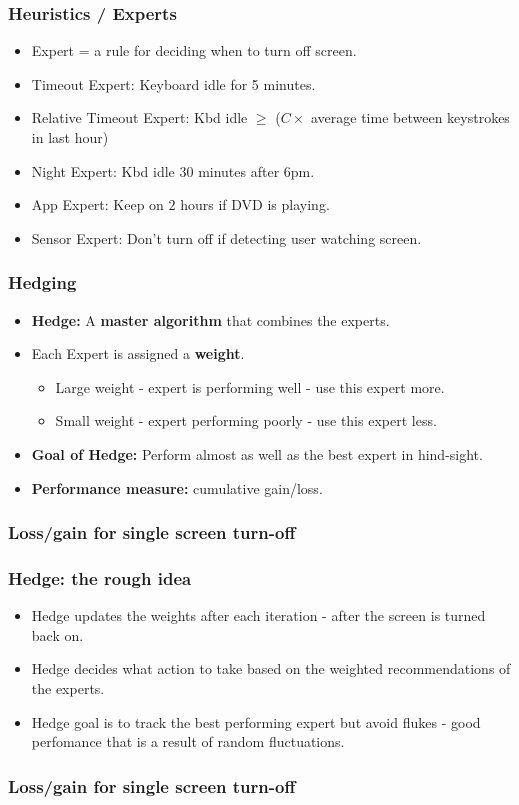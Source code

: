 \documentclass{beamer}
\newcommand{\blue}[1]{{\color{blue} #1}}
\begin{document}
\begin{frame}
\frametitle{Heuristics / Experts}
\begin{itemize}
\item Expert = a rule for deciding when to turn off screen.
\item \blue{Timeout Expert}: Keyboard idle for 5 minutes.
\item \blue{Relative Timeout Expert}: Kbd idle $\geq$ \newline
  ($C \times$ average time between keystrokes in last hour)
\item \blue{Night Expert:} Kbd idle 30 minutes after 6pm.
\item \blue{App Expert}: Keep on $2$ hours if DVD is playing.
\item \blue{Sensor Expert}: Don't turn off if detecting user watching screen.
\end{itemize}
\end{frame}

\begin{frame}
\frametitle{Hedging}
\begin{itemize}
\item \blue{\bf Hedge:} A {\bf master algorithm} that combines the experts.
\item Each Expert is assigned a {\bf weight}.
\begin{itemize}
\item Large weight - expert is performing well - use this expert more.
\item Small weight - expert performing poorly - use this expert less.
\end{itemize} 
\item \blue{\bf Goal of Hedge:} Perform almost as well as the best expert
  in hind-sight.
\item \blue{\bf Performance measure:} cumulative gain/loss.
\end{itemize}
\end{frame}

\begin{frame}
\frametitle{Loss/gain for single screen turn-off}
\end{frame}

\begin{frame}
\frametitle{Hedge: the rough idea}
\begin{itemize}
\item Hedge updates the weights after each iteration - after the
  screen is turned back on.
\item Hedge decides what action to take based on the weighted
  recommendations of the experts.
\item Hedge goal is to track the best performing expert but avoid
  flukes - good perfomance that is a result of random fluctuations.
\end{itemize}
\end{frame}

\begin{frame}
\frametitle{Loss/gain for single screen turn-off}
\end{frame}

\iffalse %
\fi
\end{document}

